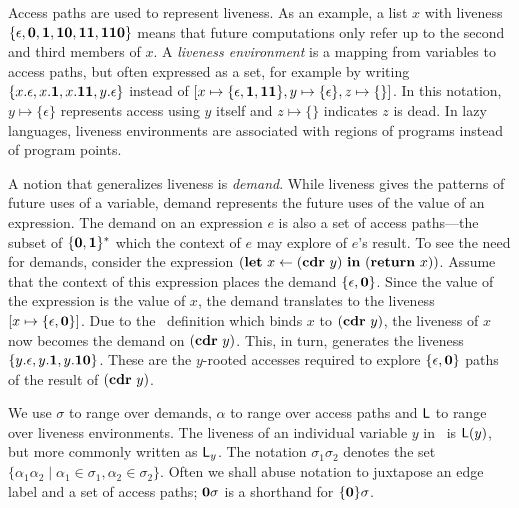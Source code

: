\documentclass[9pt,preprint,letter,nonatbib]{sigplanconf}
\begin{document}
Access paths are used to  represent liveness. As an example, a list
$x$ with 
liveness  $\{\epsilon,  \mathbf{0},  \mathbf{1},  \mathbf{1}\mathbf{0},
\mathbf{1}\mathbf{1},  \mathbf{1}\mathbf{1}\mathbf{0}\}$ means that future computations    only
refer up  to the  second and  third members of  $x$.  A  {\em liveness
  environment} is a mapping from  variables to access paths, but often
expressed as  a set,  for example  by writing  $\{x.\epsilon, x.\mathbf{1},
x.\mathbf{1}\mathbf{1},        y.\epsilon\}$        instead        of        $[x
  \mapsto\{\epsilon,\mathbf{1},\mathbf{1}\mathbf{1}\},          y\mapsto\{\epsilon\},
  z\mapsto\{\}]$.    In  this   notation,  $y   \mapsto  \{\epsilon\}$
represents access using $y$ itself and $z \mapsto \{\}$ indicates 
$z$ is dead.  In lazy  languages, liveness environments are associated
with regions of programs instead of program points.

A notion  that generalizes liveness  is {\em demand}.   While liveness
gives the patterns of future uses of a variable, demand represents the
future uses of the value of an expression.  The demand on an expression
$e$   is   also   a   set    of   access   paths---the   subset   of
$\{\mathbf{0},\mathbf{1}\}^\ast$ which the  context of $e$ may  explore of $e$'s
result.   To see  the need  for demands,  consider the expression
$(\mbox{$\mathbf{ let}$}~x\leftarrow  (\mbox{$\mathbf{cdr}$}~y)~\mbox{$\mathbf{ in}$}~   (\mbox{$\mathbf{ return}$}~x))$.   Assume   that  the
context of this expression places  the demand $\lbrace \epsilon, \mathbf{0}
\rbrace$. Since the  value of the expression is the  value of $x$, the
demand translates to the liveness  $[x \mapsto \lbrace \epsilon, \mathbf{0}
  \rbrace]$.   Due  to  the  \LET\   definition  which  binds  $x$  to
$(\mbox{$\mathbf{cdr}$}~y)$, the liveness of $x$  now becomes the demand on $(\mbox{$\mathbf{cdr}$}~y)$.
This, in  turn, generates  the liveness $\lbrace  y.\epsilon, y.\mathbf{1},
y.\mathbf{1}\mathbf{0}  \rbrace$.   These are  the $y$-rooted  accesses
required to  explore $\lbrace  \epsilon, \mathbf{0}  \rbrace$ paths  of the
result of $(\mbox{$\mathbf{cdr}$}~y)$.
  
We use $\sigma$  to range over demands, $\alpha$ to  range over access
paths and $\mathsf{L}$  to range over liveness environments.  The liveness of
an  individual variable  $y$ in  \Lv\  is $\mathsf{L}(y)$,  but more  commonly
written as  $\mathsf{L}_y$.  The notation $\sigma_1\sigma_2$  denotes the set
$\lbrace  \alpha_1\alpha_2 \mid  \alpha_1 \in  \sigma_1, \alpha_2  \in
\sigma_2\rbrace$.  Often we shall abuse  notation to juxtapose an edge
label and  a set  of access  paths; $\mathbf{0}\sigma$  is a  shorthand for
$\lbrace\mathbf{0}\rbrace\sigma$.
\end{document}
